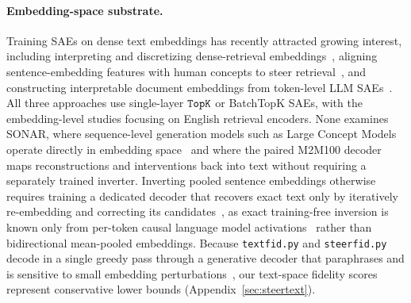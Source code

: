 \paragraph{Embedding-space substrate.}
Training SAEs on dense text embeddings has recently attracted growing
interest, including interpreting and discretizing dense-retrieval
embeddings~\cite{park2025decodingdenseembeddingssparse}, aligning
sentence-embedding features with human concepts to steer
retrieval~\cite{shin2026aligningsentenceembeddingshuman}, and constructing
interpretable document embeddings from token-level LLM
SAEs~\cite{jiang2026interpretableembeddingssparseautoencoders}. All three
approaches use single-layer $\mathop{\mathtt{TopK}}\limits$ or BatchTopK SAEs, with the
embedding-level studies focusing on English retrieval encoders. None
examines SONAR, where sequence-level generation models such as Large
Concept Models operate directly in embedding
space~\cite{lcmteam2024largeconceptmodelslanguage} and where the paired
M2M100 decoder maps reconstructions and interventions back into text
without requiring a separately trained inverter. Inverting pooled
sentence embeddings otherwise requires training a dedicated decoder that
recovers exact text only by iteratively re-embedding and correcting its
candidates~\cite{morris2023textembeddingsrevealalmost}, as exact
training-free inversion is known only from per-token causal language
model activations~\cite{nikolaou2025} rather than bidirectional
mean-pooled embeddings. Because \texttt{textfid.py} and
\texttt{steerfid.py} decode in a single greedy pass through a generative
decoder that paraphrases and is sensitive to small embedding
perturbations~\cite{sonar,lcmteam2024largeconceptmodelslanguage}, our
text-space fidelity scores represent conservative lower bounds
(Appendix~\ref{sec:steertext}).

